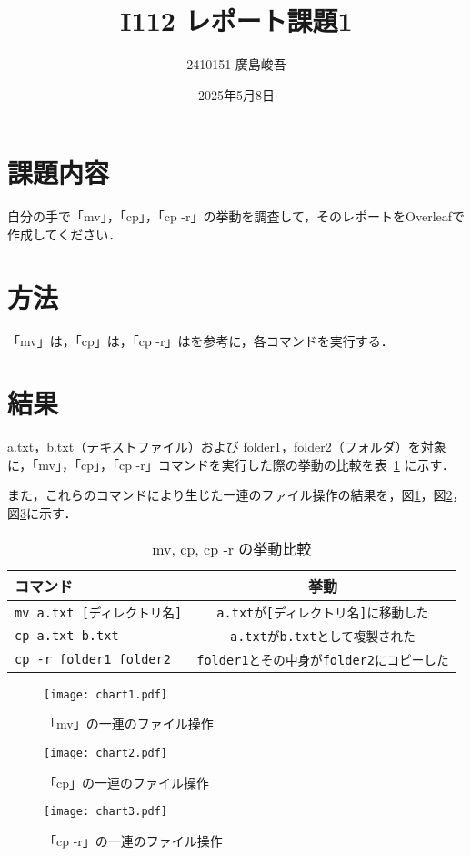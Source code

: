 \documentclass[a4paper,12pt]{jsreport}
\title{I112 レポート課題1}
\author{2410151 廣島峻吾}
\date{2025年5月8日}
\begin{document}
\maketitle

\section{課題内容}
自分の手で「mv」，「cp」，「cp -r」の挙動を調査して，そのレポートをOverleafで作成してください．

\section{方法}
「mv」は\cite{bib:mv}，「cp」は\cite{bib:cp}，「cp -r」は\cite{bib:cp-r}を参考に，各コマンドを実行する．

\section{結果}
 a.txt，b.txt（テキストファイル）および folder1，folder2（フォルダ）を対象に，「mv」，「cp」，「cp -r」コマンドを実行した際の挙動の比較を表~\ref{tbl:lcr} に示す．\par また，これらのコマンドにより生じた一連のファイル操作の結果を，図\ref{fig:chart1}，図\ref{fig:chart2}，図\ref{fig:chart3}に示す．

\begin{table}[h]
\caption{mv, cp, cp -r の挙動比較}
\label{tbl:lcr} 
\begin{tabular}{|l||c|}
\hline
\textbf{コマンド} & \textbf{挙動} \\
\hline
\texttt{mv a.txt [ディレクトリ名]} & \texttt{a.txtが[ディレクトリ名]に移動した} \\
\hline
\texttt{cp a.txt b.txt} & \texttt{a.txtがb.txtとして複製された} \\
\hline
\texttt{cp -r folder1 folder2} & \texttt{folder1とその中身がfolder2にコピーした} \\
\hline
\end{tabular}
\end{table}


\begin{figure}[h]
\centering
\texttt{[image: chart1.pdf]}
\caption{「mv」の一連のファイル操作}
\label{fig:chart1}
\end{figure}

\begin{figure}[h]
\centering
\texttt{[image: chart2.pdf]}
\caption{「cp」の一連のファイル操作}
\label{fig:chart2}
\end{figure}

\begin{figure}[h]
\centering
\texttt{[image: chart3.pdf]}
\caption{「cp -r」の一連のファイル操作}
\label{fig:chart3}
\end{figure}



\end{document}
